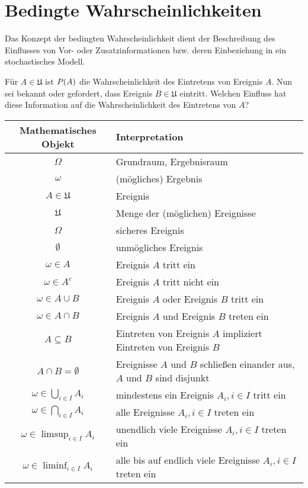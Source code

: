 \documentclass{lecture}
\begin{document}
    \section*{Bedingte Wahrscheinlichkeiten}

    Das Konzept der bedingten Wahrscheinlichkeit dient der Beschreibung des Einflusses von Vor- oder Zusatzinformationen bzw. deren Einbeziehung in ein stochastisches Modell.

    Für \(A \in \mathfrak{U}\) ist \(P\parentheses*{A}\) die Wahrscheinlichkeit des Eintretens von Ereignis \(A\).
    Nun sei bekannt oder gefordert, dass Ereignis \(B \in \mathfrak{U}\) eintritt.
    Welchen Einfluss hat diese Information auf die Wahrscheinlichkeit des Eintretens von \(A\)?

    \begin{center}
        \begin{tabular}{cl}
            \toprule
            Mathematisches Objekt & Interpretation\\
            \midrule
            \(\Omega\) & Grundraum, Ergebnisraum\\
            \(\omega\) & (mögliches) Ergebnis\\
            \(A \in \mathfrak{U}\) & Ereignis\\
            \(\mathfrak{U}\) & Menge der (möglichen) Ereignisse\\
            \(\Omega\) & sicheres Ereignis\\
            \(\emptyset\) & unmögliches Ereignis\\
            \(\omega \in A\) & Ereignis \(A\) tritt ein\\
            \(\omega \in A^c\) & Ereignis \(A\) tritt nicht ein\\
            \(\omega \in A \cup B\) & Ereignis \(A\) oder Ereignis \(B\) tritt ein\\
            \(\omega \in A \cap B\) & Ereignis \(A\) und Ereignis \(B\) treten ein\\
            \(A \subseteq B\) & Eintreten von Ereignis \(A\) impliziert Eintreten von Ereignis \(B\)\\
            \(A \cap B = \emptyset\) & Ereignisse \(A\) und \(B\) schließen einander aus, \(A\) und \(B\) sind disjunkt\\
            \(\omega \in \bigcup_{i \in I}A_i\) & mindestens ein Ereignis \(A_i, i \in I\) tritt ein\\
            \(\omega \in \bigcap_{i \in I}A_i\) & alle Ereignisse \(A_i, i \in I\) treten ein\\
            \(\omega \in \limsup_{i \in I}A_i\) & unendlich viele Ereignisse \(A_i, i \in I\) treten ein\\
            \(\omega \in \liminf_{i \in I}A_i\) & alle bis auf endlich viele Ereignisse \(A_i, i \in I\) treten ein\\
            \bottomrule
        \end{tabular}
    \end{center}
\end{document}
